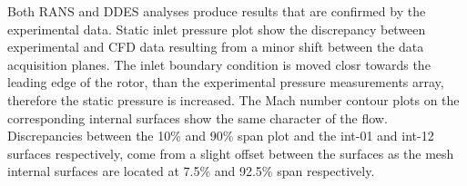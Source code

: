 %

Both RANS and DDES analyses produce results that are confirmed by the experimental data. Static inlet pressure plot show the discrepancy between experimental and CFD data resulting from a minor shift between the data acquisition planes. The inlet boundary condition is moved closr towards the leading edge of the rotor, than the experimental pressure measurements array, therefore the static pressure is increased. The Mach number contour plots on the corresponding internal surfaces show the same character of the flow. Discrepancies between the 10\% and 90\% span plot and the int-01 and int-12 surfaces respectively, come from a slight offset between the surfaces as the mesh internal surfaces are located at 7.5\% and 92.5\% span respectively.